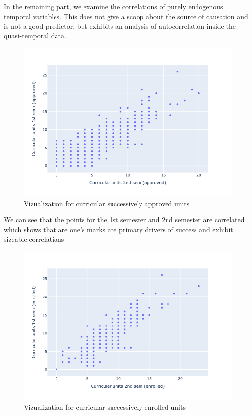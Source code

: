 \documentclass[
  letterpaper,
  DIV=11,
  numbers=noendperiod]{scrartcl}
\begin{document}
In the remaining part, we examine the correlations of purely endogenous
temporal variables. This does not give a scoop about the source of
causation and is not a good predictor, but exhibits an analysis of
autocorrelation inside the quasi-temporal data.

\begin{figure}

{\centering \includegraphics{report_AzadhdhinNedalYunisAlFraijat_files/figure-pdf/fig-cur-units-output-1.png}

}

\caption{\label{fig-cur-units}Vizualization for curricular successively
approved units}

\end{figure}

We can see that the points for the 1st semester and 2nd semester are
correlated which shows that are one's marks are primary drivers of
success and exhibit sizeable correlations

\begin{figure}

{\centering \includegraphics{report_AzadhdhinNedalYunisAlFraijat_files/figure-pdf/fig-cur-units-enrolled-output-1.png}

}

\caption{\label{fig-cur-units-enrolled}Vizualization for curricular
successively enrolled units}

\end{figure}
\end{document}
